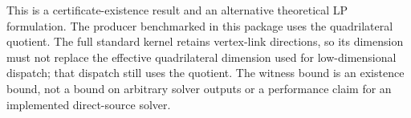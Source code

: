 This is a certificate-existence result and an alternative theoretical
LP formulation.  The producer benchmarked in this package uses the
quadrilateral quotient.  The full standard kernel retains vertex-link
directions, so its dimension must not replace the effective quadrilateral
dimension used for low-dimensional dispatch; that dispatch still uses
the quotient.  The witness bound is an existence bound, not a bound on
arbitrary solver outputs or a performance claim for an implemented
direct-source solver.

